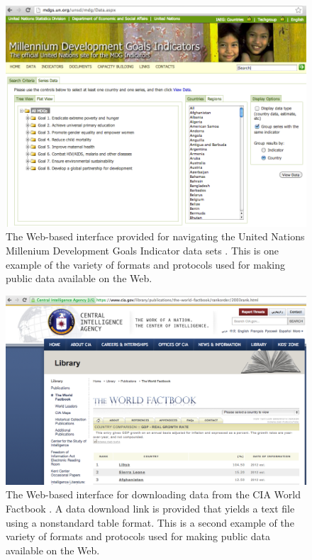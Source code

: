 \documentclass[12pt]{article}
\begin{document}
\begin{doublespace}
\begin{figure}[h!]
  \centering
  \includegraphics[width=\textwidth]{figures/MDGInterface.png}
  \caption[Millenium Development Goals Web Interface.]
   {The Web-based interface provided for navigating the United Nations Millenium Development Goals Indicator data sets \cite{mdgDataUI}. This is one example of the variety of formats and protocols used for making public data available on the Web.}
  \label{fig:MDGInterface}
\end{figure}

\begin{figure}[h!]
  \centering
  \includegraphics[width=\textwidth]{figures/CIAWorldFactbook.png}
  \caption[CIA World Factbook Web Interface.]
    {The Web-based interface for downloading data from the CIA World Factbook \cite{ciaWorldFactbookData}. A data download link is provided that yields a text file using a nonstandard table format. This is a second example of the variety of formats and protocols used for making public data available on the Web.}
  \label{fig:ciaWorldFactbook}
\end{figure}


\end{doublespace}
\end{document}
